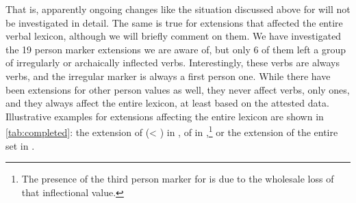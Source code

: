 %
%
%

That is, apparently ongoing changes like the situation discussed above for \kaxui will not be investigated in detail.
The same is true for extensions that affected the entire verbal lexicon, although we will briefly comment on them.
We have investigated the 19 person marker extensions we are aware of, but only 6 of them left a group of irregularly or archaically inflected verbs.
Interestingly, these verbs are always  verbs, and the irregular marker is always a first person one.
While there have been extensions for other person values as well, they never affect  verbs, only  ones, and they always affect the entire lexicon, at least based on the attested data.
Illustrative examples for extensions affecting the entire lexicon are shown in \cref{tab:completed}: the extension of   (< ) in \apalai {}, of   in \panare {},\footnote{The presence of the third person marker  for  is due to the wholesale loss of that inflectional value.} or the extension of the entire  set in \waimiri {}.%

